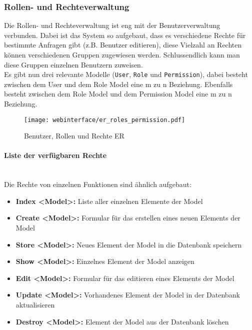 \subsubsection{Rollen- und Rechteverwaltung}
Die Rollen- und Rechteverwaltung ist eng mit der Benutzerverwaltung verbunden.
Dabei ist das System so aufgebaut, dass es verschiedene Rechte für bestimmte
Anfragen gibt (z.B. Benutzer editieren), diese Vielzahl an Rechten können
verschiedenen Gruppen zugewiesen werden. Schlussendlich kann man diese Gruppen
einzelnen Benutzern zuweisen.\\

Es gibt nun drei relevante Modelle (\verb|User|, \verb|Role| und \verb|Permission|), dabei
besteht zwischen dem User und dem Role Model eine m zu n Beziehung. Ebenfalls
besteht zwischen dem Role Model und dem Permission Model eine m zu n Beziehung.

\begin{figure}[H]
  \centering
  \texttt{[image: webinterface/er\_roles\_permission.pdf]}
  \caption{Benutzer, Rollen und Rechte ER}
\end{figure}

\paragraph{Liste der verfügbaren Rechte}\mbox{}\\

Die Rechte von einzelnen Funktionen sind ähnlich aufgebaut:

\begin{itemize}
  \item \textbf{Index <Model>:} Liste aller einzelnen Elemente der Model
  \item \textbf{Create <Model>:} Formular für das erstellen eines neuen
  Elements der Model
  \item \textbf{Store <Model>:} Neues Element der Model in die Datenbank speichern
  \item \textbf{Show <Model>:} Einzelnes Element der Model anzeigen
  \item \textbf{Edit <Model>:} Formular für das editieren eines Elements der
  Model
  \item \textbf{Update <Model>:} Vorhandenes Element der Model in der
  Datenbank aktualisieren
  \item \textbf{Destroy <Model>:} Element der Model aus der Datenbank löschen
\end{itemize}

